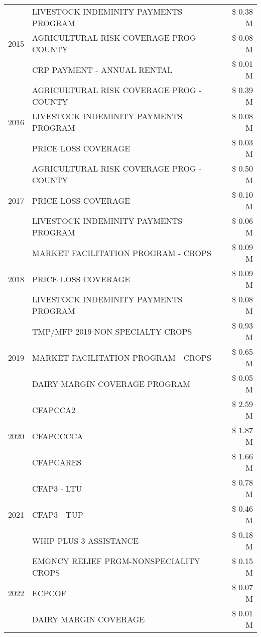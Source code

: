 \begin{tabular}{llr}
\cline{1-3}
\multirow[t]{3}{*}{2015} & LIVESTOCK INDEMINITY PAYMENTS PROGRAM & \$ 0.38 M \\
 & AGRICULTURAL RISK COVERAGE PROG - COUNTY & \$ 0.08 M \\
 & CRP PAYMENT - ANNUAL RENTAL & \$ 0.01 M \\
\cline{1-3}
\multirow[t]{3}{*}{2016} & AGRICULTURAL RISK COVERAGE PROG - COUNTY & \$ 0.39 M \\
 & LIVESTOCK INDEMINITY PAYMENTS PROGRAM & \$ 0.08 M \\
 & PRICE LOSS COVERAGE & \$ 0.03 M \\
\cline{1-3}
\multirow[t]{3}{*}{2017} & AGRICULTURAL RISK COVERAGE PROG - COUNTY & \$ 0.50 M \\
 & PRICE LOSS COVERAGE & \$ 0.10 M \\
 & LIVESTOCK INDEMINITY PAYMENTS PROGRAM & \$ 0.06 M \\
\cline{1-3}
\multirow[t]{3}{*}{2018} & MARKET FACILITATION PROGRAM - CROPS & \$ 0.09 M \\
 & PRICE LOSS COVERAGE & \$ 0.09 M \\
 & LIVESTOCK INDEMINITY PAYMENTS PROGRAM & \$ 0.08 M \\
\cline{1-3}
\multirow[t]{3}{*}{2019} & TMP/MFP 2019 NON SPECIALTY CROPS & \$ 0.93 M \\
 & MARKET FACILITATION PROGRAM - CROPS & \$ 0.65 M \\
 & DAIRY MARGIN COVERAGE PROGRAM & \$ 0.05 M \\
\cline{1-3}
\multirow[t]{3}{*}{2020} & CFAPCCA2 & \$ 2.59 M \\
 & CFAPCCCCA & \$ 1.87 M \\
 & CFAPCARES & \$ 1.66 M \\
\cline{1-3}
\multirow[t]{3}{*}{2021} & CFAP3 - LTU & \$ 0.78 M \\
 & CFAP3 - TUP & \$ 0.46 M \\
 & WHIP PLUS 3 ASSISTANCE & \$ 0.18 M \\
\cline{1-3}
\multirow[t]{3}{*}{2022} & EMGNCY RELIEF PRGM-NONSPECIALITY CROPS & \$ 0.15 M \\
 & ECPCOF & \$ 0.07 M \\
 & DAIRY MARGIN COVERAGE & \$ 0.01 M \\
\cline{1-3}
\bottomrule
\end{tabular}
